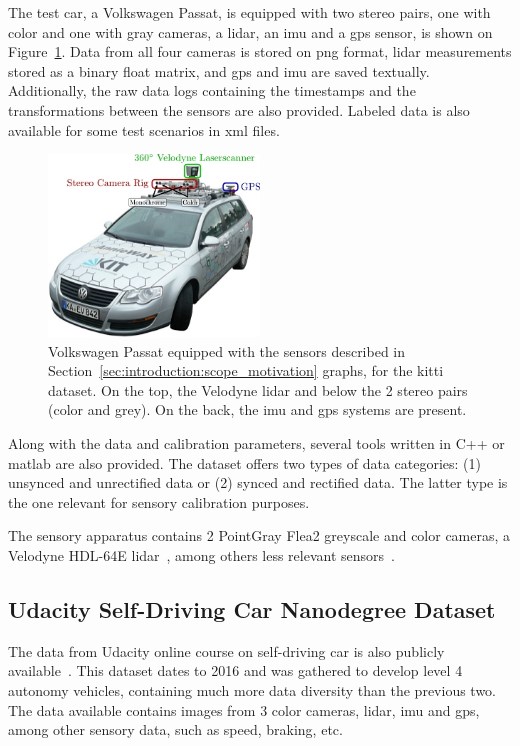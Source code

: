 The test car, a Volkswagen Passat, is equipped with two stereo pairs, one with color and one with gray cameras, a \ac{lidar}, an \ac{imu} and a \ac{gps} sensor, is shown on Figure~\ref{fig:sota:kitti_sensors}. Data from all four cameras is stored on \ac{png} format, \ac{lidar} measurements stored as a binary float matrix, and \ac{gps} and \ac{imu} are saved textually. Additionally, the raw data logs containing the timestamps and the transformations between the sensors are also provided. Labeled data is also available for some test scenarios in \ac{xml} files.

\begin{figure}[!ht]
	\centering
	\includegraphics[width=0.5\textwidth]{img/sensor_fusion/passat_sensors.jpg}
	\caption[Volkswagen Passat used for recording \acs{kitti} dataset.]{Volkswagen Passat equipped with the sensors described in Section~\ref{sec:introduction:scope_motivation} graphs, for the \ac{kitti} dataset. On the top, the Velodyne \ac{lidar} and below the 2 stereo pairs (color and grey). On the back, the \ac{imu} and \ac{gps} systems are present.}
	\label{fig:sota:kitti_sensors}
\end{figure}


Along with the data and calibration parameters, several tools written in C++ or \ac{matlab} are also provided. The dataset offers two types of data categories: (1) unsynced and unrectified data or (2) synced and rectified data. The latter type is the one relevant for sensory calibration purposes.

The sensory apparatus contains 2 PointGray Flea2 greyscale and color cameras, a Velodyne HDL-64E \ac{lidar}~\cite{VelodyneHDL64}, among others less relevant sensors~\cite{Geiger2013a}.

\subsection{Udacity Self-Driving Car Nanodegree Dataset}
The data from Udacity online course on self-driving car is also publicly available~\cite{udacity}. This dataset dates to 2016 and was gathered to develop level 4 autonomy vehicles, containing much more data diversity than the previous two. The data available contains images from 3 color cameras,  \ac{lidar}, \ac{imu} and \ac{gps}, among other sensory data, such as speed, braking, etc.

